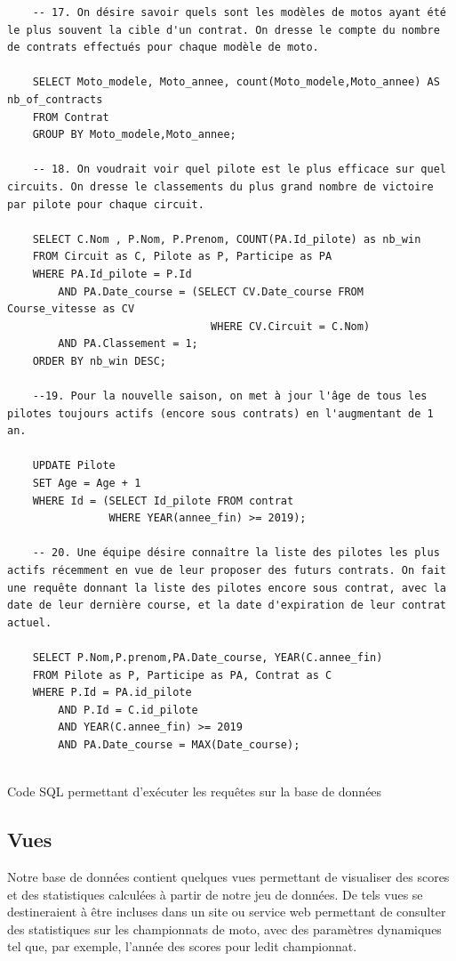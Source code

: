 \documentclass[12pt,a4paper]{article}
\newenvironment{code}{\captionsetup{type=listing}}{}
\begin{document}
\begin{code}
\begin{verbatim}
    -- 17. On désire savoir quels sont les modèles de motos ayant été le plus souvent la cible d'un contrat. On dresse le compte du nombre de contrats effectués pour chaque modèle de moto.

    SELECT Moto_modele, Moto_annee, count(Moto_modele,Moto_annee) AS nb_of_contracts
    FROM Contrat
    GROUP BY Moto_modele,Moto_annee;
    
    -- 18. On voudrait voir quel pilote est le plus efficace sur quel circuits. On dresse le classements du plus grand nombre de victoire par pilote pour chaque circuit.

    SELECT C.Nom , P.Nom, P.Prenom, COUNT(PA.Id_pilote) as nb_win
    FROM Circuit as C, Pilote as P, Participe as PA
    WHERE PA.Id_pilote = P.Id
        AND PA.Date_course = (SELECT CV.Date_course FROM Course_vitesse as CV
                                WHERE CV.Circuit = C.Nom)
        AND PA.Classement = 1;
    ORDER BY nb_win DESC;
    
    --19. Pour la nouvelle saison, on met à jour l'âge de tous les pilotes toujours actifs (encore sous contrats) en l'augmentant de 1 an.

    UPDATE Pilote
    SET Age = Age + 1
    WHERE Id = (SELECT Id_pilote FROM contrat
                WHERE YEAR(annee_fin) >= 2019);
                
    -- 20. Une équipe désire connaître la liste des pilotes les plus actifs récemment en vue de leur proposer des futurs contrats. On fait une requête donnant la liste des pilotes encore sous contrat, avec la date de leur dernière course, et la date d'expiration de leur contrat actuel.

    SELECT P.Nom,P.prenom,PA.Date_course, YEAR(C.annee_fin)
    FROM Pilote as P, Participe as PA, Contrat as C
    WHERE P.Id = PA.id_pilote
        AND P.Id = C.id_pilote
        AND YEAR(C.annee_fin) >= 2019
        AND PA.Date_course = MAX(Date_course);
    
    \end{verbatim}
    \caption{Code SQL permettant d'exécuter les requêtes sur la base de données}
    \label{lst.request}
\end{code}

\subsection{Vues}
\label{sub.views}

Notre base de données contient quelques vues permettant de visualiser des scores
et des statistiques calculées à partir de notre jeu de données. De tels vues se
destineraient à être incluses dans un site ou service web permettant de consulter
des statistiques sur les championnats de moto, avec des paramètres dynamiques
tel que, par exemple, l'année des scores pour ledit championnat.
\end{document}
